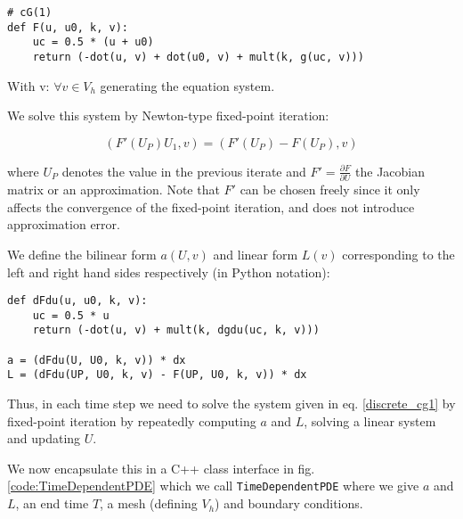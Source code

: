 {\small
\begin{lstlisting}
# cG(1)
def F(u, u0, k, v):
    uc = 0.5 * (u + u0)
    return (-dot(u, v) + dot(u0, v) + mult(k, g(uc, v)))
\end{lstlisting}
}

With v: $\forall v \in V_h$ generating the equation system.

We solve this system by Newton-type fixed-point iteration:

\begin{equation}
(F'(U_P) U_1, v) = (F'(U_P) - F(U_P), v)
\label{discrete_cg1}
\end{equation}

where $U_P$ denotes the value in the previous iterate and $F'
= \frac{\partial F}{\partial U}$ the Jacobian matrix or an
approximation. Note that $F'$ can be chosen freely since it only
affects the convergence of the fixed-point iteration, and does not
introduce approximation error.

We define the bilinear form $a(U, v)$ and linear form $L(v)$
corresponding to the left and right hand sides respectively (in Python
notation):


{\small
\begin{lstlisting}
def dFdu(u, u0, k, v):
    uc = 0.5 * u
    return (-dot(u, v) + mult(k, dgdu(uc, k, v)))

a = (dFdu(U, U0, k, v)) * dx
L = (dFdu(UP, U0, k, v) - F(UP, U0, k, v)) * dx
\end{lstlisting}
}

Thus, in each time step we need to solve the system given in
eq. \ref{discrete_cg1} by fixed-point iteration by repeatedly
computing $a$ and $L$, solving a linear system and updating $U$.

We now encapsulate this in a C++ class interface in
fig. \ref{code:TimeDependentPDE} which we call {\tt TimeDependentPDE} where
we give $a$ and $L$, an end time $T$, a mesh (defining $V_h$) and
boundary conditions.





